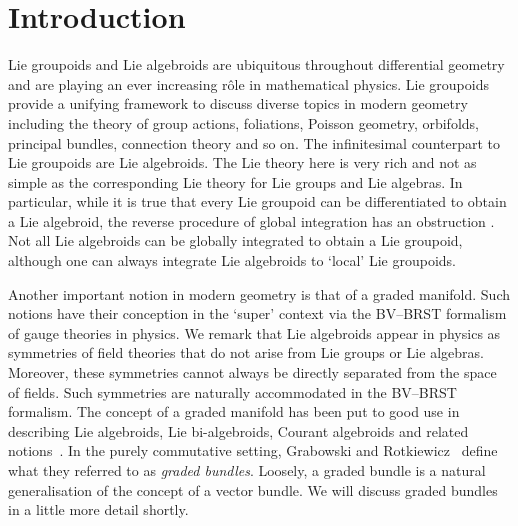 \documentclass[pdftex]{sigma}
\numberwithin{equation}{section}
\begin{document}


\renewcommand{\thefootnote}{\arabic{footnote}}
\setcounter{footnote}{0}

\section{Introduction}\label{sec:Intro}
Lie groupoids and Lie algebroids are ubiquitous throughout dif\/ferential geometry and are playing an ever increasing r\^{o}le in mathematical physics.  Lie groupoids provide a unifying framework to discuss diverse topics in modern geometry including the theory of group actions, foliations, Poisson geometry, orbifolds, principal bundles, connection theory  and so on.  The inf\/initesimal counterpart to Lie groupoids are  Lie algebroids. The Lie theory here is very rich and not as simple as the corresponding Lie theory for   Lie groups and Lie algebras. In particular, while it is true  that  every Lie groupoid  can be dif\/ferentiated to obtain a Lie algebroid, the reverse procedure of  global integration has an obstruction \cite{Crainic:2003,Mackenzie:1987}. Not all Lie algebroids can be globally  integrated to obtain a Lie groupoid,  although one can always integrate Lie algebroids to `local' Lie groupoids.

Another important notion in modern geometry is that of a graded manifold. Such notions  have their conception in the `super' context via the BV--BRST formalism of gauge theories in physics. We remark that Lie algebroids appear in physics as symmetries of f\/ield theories that do not arise from Lie groups or Lie algebras. Moreover, these symmetries cannot always be directly separated from the space of f\/ields. Such symmetries are naturally accommodated in the  BV--BRST formalism. The concept of  a graded manifold has  been put to good use in describing Lie algebroids, Lie bi-algebroids, Courant algebroids and related notions~\cite{Roytenberg:2001,Roytenberg:2006,Voronov:2001qf,Voronov:2012}.    In the purely commutative setting, Grabowski and Rotkiewicz~\cite{Grabowski2012} def\/ine what they referred to as \emph{graded bundles}. Loosely, a graded bundle is a natural generalisation of the concept of a vector bundle. We will discuss graded bundles in a little more detail shortly.
\end{document}
